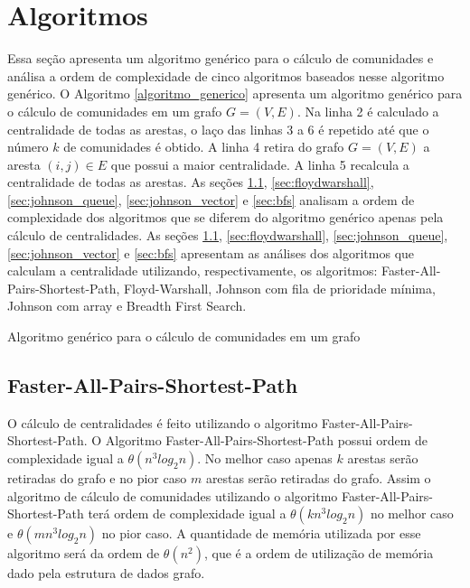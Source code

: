 \section{Algoritmos}\label{sec:algoritmos} 
Essa seção apresenta um algoritmo genérico para o cálculo de comunidades e análisa a ordem de complexidade de cinco algoritmos baseados nesse algoritmo genérico.
O Algoritmo \ref{algoritmo_generico} apresenta um algoritmo genérico para o cálculo de comunidades em um grafo $G = (V, E)$.
Na linha 2 é calculado a centralidade de todas as arestas, o laço das linhas 3 a 6 é repetido até que o número $k$ de comunidades
é obtido. A linha 4 retira do grafo $G = (V, E)$ a aresta $(i, j) \in E$ que possui a maior centralidade. A linha 5 recalcula a centralidade de todas as arestas.
As seções \ref{sec:faster}, \ref{sec:floydwarshall}, \ref{sec:johnson_queue}, \ref{sec:johnson_vector} e \ref{sec:bfs} 
analisam a ordem de complexidade dos algoritmos que se diferem do algoritmo genérico apenas pela cálculo de centralidades. As seções 
\ref{sec:faster}, \ref{sec:floydwarshall}, \ref{sec:johnson_queue}, \ref{sec:johnson_vector} e \ref{sec:bfs} 
apresentam as análises dos algoritmos que calculam a centralidade utilizando, respectivamente, os algoritmos: Faster-All-Pairs-Shortest-Path\cite{cormen3ndFaster}, Floyd-Warshall\cite{cormen3ndFloydwarshall}, Johnson com fila de prioridade mínima\cite{cormen3ndjohnson}, Johnson com array\cite{cormen3ndjohnson} e Breadth First Search\cite{cormen3ndbfs}.

\begin{algorithm}
\caption{Algoritmo genérico para o cálculo de comunidades em um grafo}
\label{algoritmo_generico}
\end{algorithm}

\subsection{Faster-All-Pairs-Shortest-Path}\label{sec:faster}
O cálculo de centralidades é feito utilizando o algoritmo Faster-All-Pairs-Shortest-Path. O Algoritmo Faster-All-Pairs-Shortest-Path
possui ordem de complexidade igual a $\theta(n^3log_2n)$. No melhor caso apenas $k$ arestas serão retiradas do grafo e no pior
caso $m$ arestas serão retiradas do grafo. Assim o algoritmo de cálculo de comunidades utilizando o algoritmo Faster-All-Pairs-Shortest-Path terá ordem de complexidade igual a $\theta(kn^3log_2n)$ no melhor caso e $\theta(mn^3log_2n)$ no pior caso. A quantidade
de memória utilizada por esse algoritmo será da ordem de $\theta(n^2)$, que é a ordem de utilização de memória dado pela estrutura
de dados grafo.

